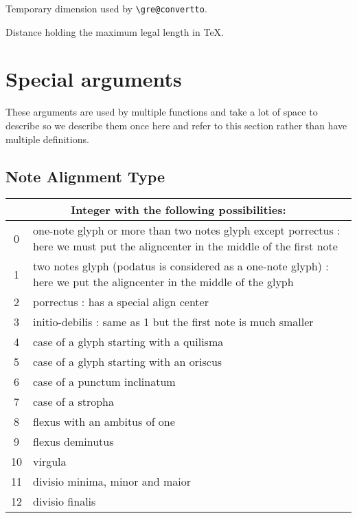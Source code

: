 Temporary dimension used by \verb=\gre@convertto=.

Distance holding the maximum legal length in TeX.



\section{Special arguments}

These arguments are used by multiple functions and take a lot of space
to describe so we describe them once here and refer to this section
rather than have multiple definitions.

\subsection{Note Alignment Type}\label{notesalign}
\begin{tabular}{cp{}}
  \multicolumn{2}{c}{Integer with the following possibilities:} \\
  \hline
  0 & one-note glyph or more than two notes glyph except porrectus : here we must put the aligncenter in the middle of the first note\\
  1 & two notes glyph (podatus is considered as a one-note glyph) : here we put the aligncenter in the middle of the glyph\\
  2 & porrectus : has a special align center\\
  3 & initio-debilis : same as 1 but the first note is much smaller\\
  4 & case of a glyph starting with a quilisma\\
  5 & case of a glyph starting with an oriscus\\
  6 & case of a punctum inclinatum\\
  7 & case of a stropha\\
  8 & flexus with an ambitus of one\\
  9 & flexus deminutus\\
  10 & virgula\\
  11 & divisio minima, minor and maior\\
  12 & divisio finalis
 \end{tabular}

